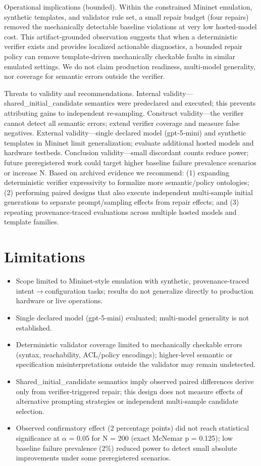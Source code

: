 \documentclass[conference]{IEEEtran}
\begin{document}
Operational implications (bounded). Within the constrained Mininet emulation, synthetic templates, and validator rule set, a small repair budget (four repairs) removed the mechanically detectable baseline violations at very low hosted‑model cost. This artifact‑grounded observation suggests that when a deterministic verifier exists and provides localized actionable diagnostics, a bounded repair policy can remove template‑driven mechanically checkable faults in similar emulated settings. We do not claim production readiness, multi‑model generality, nor coverage for semantic errors outside the verifier.

Threats to validity and recommendations. Internal validity---shared\_initial\_candidate semantics were predeclared and executed; this prevents attributing gains to independent re‑sampling. Construct validity---the verifier cannot detect all semantic errors; extend verifier coverage and measure false negatives. External validity---single declared model (gpt‑5‑mini) and synthetic templates in Mininet limit generalization; evaluate additional hosted models and hardware testbeds. Conclusion validity---small discordant counts reduce power; future preregistered work could target higher baseline failure prevalence scenarios or increase N. Based on archived evidence we recommend: (1) expanding deterministic verifier expressivity to formalize more semantic/policy ontologies; (2) performing paired designs that also execute independent multi‑sample initial generations to separate prompt/sampling effects from repair effects; and (3) repeating provenance‑traced evaluations across multiple hosted models and template families.

\section{Limitations}
\begin{itemize}
\item Scope limited to Mininet‑style emulation with synthetic, provenance‑traced intent\ensuremath{\rightarrow}configuration tasks; results do not generalize directly to production hardware or live operations.
\item Single declared model (gpt‑5‑mini) evaluated; multi‑model generality is not established.
\item Deterministic validator coverage limited to mechanically checkable errors (syntax, reachability, ACL/policy encodings); higher‑level semantic or specification misinterpretations outside the validator may remain undetected.
\item Shared\_initial\_candidate semantics imply observed paired differences derive only from verifier‑triggered repair; this design does not measure effects of alternative prompting strategies or independent multi‑sample candidate selection.
\item Observed confirmatory effect (2 percentage points) did not reach statistical significance at \ensuremath{\alpha} = 0.05 for N = 200 (exact McNemar p = 0.125); low baseline failure prevalence (2\%) reduced power to detect small absolute improvements under some preregistered scenarios.
\end{itemize}
\end{document}
